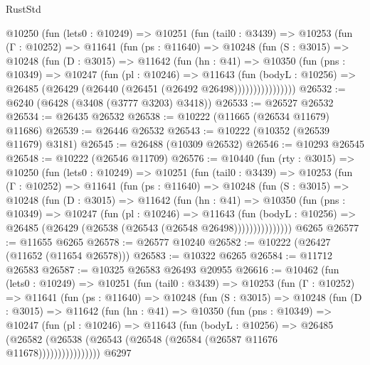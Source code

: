 \begin{lexlean}{RustStd}
\begin{coremodule}
      @10250
        (fun (lets0 : @10249) =>
        @10251
          (fun (tail0 : @3439) =>
          @10253
            (fun (Γ : @10252) =>
            @11641
              (fun (ps : @11640) =>
              @10248
                (fun (S : @3015) =>
                @10248
                  (fun (D : @3015) =>
                  @11642
                    (fun (hn : @41) =>
                    @10350
                      (fun (pns : @10349) =>
                      @10247
                        (fun (pl : @10246) =>
                        @11643
                          (fun (bodyL : @10256) =>
                          @26485 (@26429 (@26440 (@26451 (@26492 @26498))))))))))))))))
@26532 := @6240 (@6428 (@3408 (@3777 @3203) @3418))
@26533 := @26527 @26532
@26534 := @26435 @26532
@26538 := @10222 (@11665 (@26534 @11679) @11686)
@26539 := @26446 @26532
@26543 := @10222 (@10352 (@26539 @11679) @3181)
@26545 := @26488 (@10309 @26532)
@26546 := @10293 @26545
@26548 := @10222 (@26546 @11709)
@26576 := @10440
    (fun (rty : @3015) =>
    @10250
      (fun (lets0 : @10249) =>
      @10251
        (fun (tail0 : @3439) =>
        @10253
          (fun (Γ : @10252) =>
          @11641
            (fun (ps : @11640) =>
            @10248
              (fun (S : @3015) =>
              @10248
                (fun (D : @3015) =>
                @11642
                  (fun (hn : @41) =>
                  @10350
                    (fun (pns : @10349) =>
                    @10247
                      (fun (pl : @10246) =>
                      @11643
                        (fun (bodyL : @10256) =>
                        @26485 (@26429 (@26538 (@26543 (@26548 @26498)))))))))))))))
    @6265
@26577 := @11655 @6265
@26578 := @26577 @10240
@26582 := @10222 (@26427 (@11652 (@11654 @26578)))
@26583 := @10322 @6265
@26584 := @11712 @26583
@26587 := @10325 @26583 @26493 @20955
@26616 := @10462
    (fun (lets0 : @10249) =>
    @10251
      (fun (tail0 : @3439) =>
      @10253
        (fun (Γ : @10252) =>
        @11641
          (fun (ps : @11640) =>
          @10248
            (fun (S : @3015) =>
            @10248
              (fun (D : @3015) =>
              @11642
                (fun (hn : @41) =>
                @10350
                  (fun (pns : @10349) =>
                  @10247
                    (fun (pl : @10246) =>
                    @11643
                      (fun (bodyL : @10256) =>
                      @26485
                        (@26582
                          (@26538 (@26543 (@26548 (@26584 (@26587 @11676 @11678))))))))))))))))
    @6297

\end{coremodule}
\end{lexlean}
